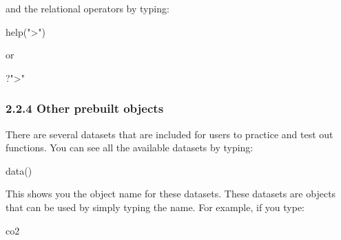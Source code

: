 \documentclass[
]{article}
\newenvironment{Shaded}{\begin{snugshade}}{\end{snugshade}}
\newcommand{\FunctionTok}[1]{\textcolor[rgb]{0.00,0.00,0.00}{#1}}
\newcommand{\NormalTok}[1]{#1}
\newcommand{\StringTok}[1]{\textcolor[rgb]{0.31,0.60,0.02}{#1}}
\begin{document}
and the relational operators by typing:

\begin{Shaded}
\begin{Highlighting}[]
\FunctionTok{help}\NormalTok{(}\StringTok{"\textgreater{}"}\NormalTok{)}
\end{Highlighting}
\end{Shaded}

or

\begin{Shaded}
\begin{Highlighting}[]
\NormalTok{?}\StringTok{"\textgreater{}"}
\end{Highlighting}
\end{Shaded}

\hypertarget{other-prebuilt-objects}{%
\subsubsection{2.2.4 Other prebuilt
objects}\label{other-prebuilt-objects}}

There are several datasets that are included for users to practice and
test out functions. You can see all the available datasets by typing:

\begin{Shaded}
\begin{Highlighting}[]
\FunctionTok{data}\NormalTok{()}
\end{Highlighting}
\end{Shaded}

This shows you the object name for these datasets. These datasets are
objects that can be used by simply typing the name. For example, if you
type:

\begin{Shaded}
\begin{Highlighting}[]
\NormalTok{co2}
\end{Highlighting}
\end{Shaded}
\end{document}
